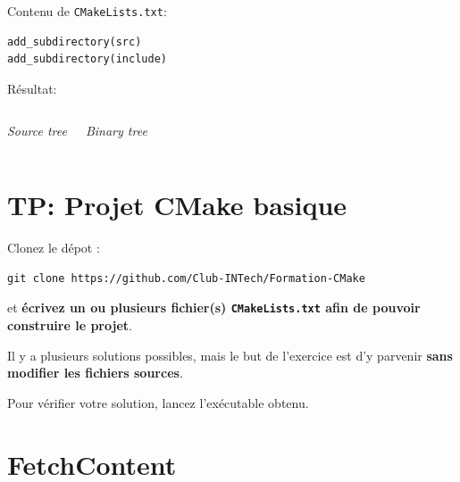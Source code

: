 \documentclass{beamer}
\newenvironment{Frame}{\begin{frame}[containsverbatim]{\subsecname}}{\end{frame}}
\newenvironment{FrameTP}{\begin{frame}[containsverbatim]{\secname}}{\end{frame}}
\newcommand{\SectionFrame}[0]{
    \begin{frame}
        \centering
        \Large
        \textbf{\secname}
    \end{frame}
}
\begin{document}
\begin{Frame}
    \setlength{\DTbaselineskip}{0.8em}
    Contenu de \texttt{CMakeLists.txt}:
    
    \begin{verbatim}
add_subdirectory(src)
add_subdirectory(include)
    \end{verbatim}

    Résultat:
    \begin{columns}
        \begin{center}   
            \textit{Source tree}
        \end{center}
        \footnotesize

        \begin{center}   
            \textit{Binary tree}
        \end{center}
    \end{columns}
\end{Frame}

\section{TP: Projet CMake basique}

\SectionFrame

\begin{FrameTP}
    Clonez le dépot :
    \begin{verbatim}
git clone https://github.com/Club-INTech/Formation-CMake
    \end{verbatim}
    et \textbf{écrivez un ou plusieurs fichier(s) \texttt{CMakeLists.txt} afin de pouvoir construire le projet}.
    
    Il y a plusieurs solutions possibles, mais le but de l'exercice est d'y parvenir \textbf{sans modifier les fichiers sources}.
    
    Pour vérifier votre solution, lancez l'exécutable obtenu.
\end{FrameTP}

\section{FetchContent}
\end{document}

